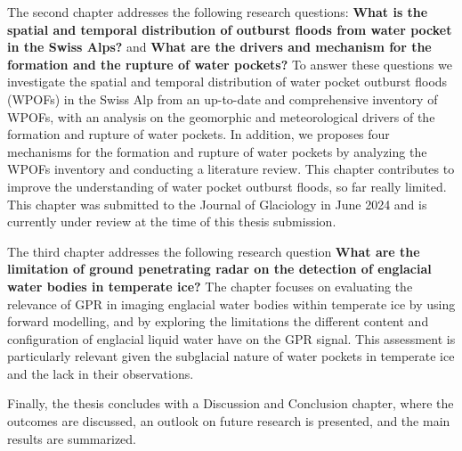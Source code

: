 The second chapter addresses the following research questions: \textbf{What is the spatial and temporal distribution of outburst floods from water pocket in the Swiss Alps?} and \textbf{What are the drivers and mechanism for the formation and the rupture of water pockets?} To answer these questions we investigate the spatial and temporal distribution of water pocket outburst floods (WPOFs) in the Swiss Alp from an up-to-date and comprehensive inventory of WPOFs, with an analysis on the geomorphic and meteorological drivers of the formation and rupture of water pockets. In addition, we proposes four mechanisms for the formation and rupture of water pockets by analyzing the WPOFs inventory and conducting a literature review. This chapter contributes to improve the understanding of water pocket outburst floods, so far really limited. This chapter was submitted to the Journal of Glaciology in June 2024 and is currently under review at the time of this thesis submission.
%

The third chapter \citep{Ogier&al2023} addresses the following research question \textbf{What are the limitation of ground penetrating radar on the detection of englacial water bodies in temperate ice?} The chapter focuses on evaluating the relevance of GPR in imaging englacial water bodies within temperate ice by using forward modelling, and by exploring the limitations the different content and configuration of englacial liquid water have on the GPR signal. This assessment is particularly relevant given the subglacial nature of water pockets in temperate ice and the lack in their observations.

Finally, the thesis concludes with a Discussion and Conclusion chapter, where the outcomes are discussed, an outlook on future research is presented, and the main results are summarized.





